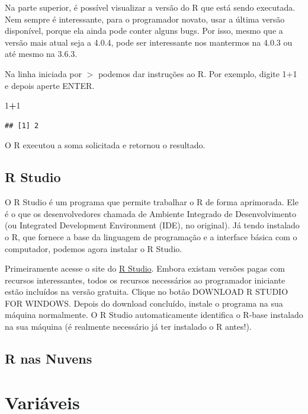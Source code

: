\documentclass[
]{book}
\newenvironment{Shaded}{\begin{snugshade}}{\end{snugshade}}
\newcommand{\DecValTok}[1]{\textcolor[rgb]{0.00,0.00,0.81}{#1}}
\newcommand{\OperatorTok}[1]{\textcolor[rgb]{0.81,0.36,0.00}{\textbf{#1}}}
\begin{document}
Na parte superior, é possível visualizar a versão do R que está sendo executada. Nem sempre é interessante, para o programador novato, usar a última versão disponível, porque ela ainda pode conter alguns bugs. Por isso, mesmo que a versão mais atual seja a 4.0.4, pode ser interessante nos mantermos na 4.0.3 ou até mesmo na 3.6.3.

Na linha iniciada por \(>\) podemos dar instruções ao R. Por exemplo, digite 1+1 e depois aperte ENTER.

\begin{Shaded}
\begin{Highlighting}[]
\DecValTok{1}\OperatorTok{+}\DecValTok{1}
\end{Highlighting}
\end{Shaded}

\begin{verbatim}
## [1] 2
\end{verbatim}

O R executou a soma solicitada e retornou o resultado.

\hypertarget{r-studio}{%
\section{R Studio}\label{r-studio}}

O R Studio é um programa que permite trabalhar o R de forma aprimorada. Ele é o que os desenvolvedores chamada de Ambiente Integrado de Desenvolvimento (ou Integrated Development Environment (IDE), no original). Já tendo instalado o R, que fornece a base da linguagem de programação e a interface básica com o computador, podemos agora instalar o R Studio.

Primeiramente acesse o site do \href{https://www.rstudio.com/products/rstudio/download/\#download}{R Studio}. Embora existam versões pagas com recursos interessantes, todos os recursos necessários ao programador iniciante estão incluídos na versão gratuita. Clique no botão DOWNLOAD R STUDIO FOR WINDOWS. Depois do download concluído, instale o programa na sua máquina normalmente. O R Studio automaticamente identifica o R-base instalado na sua máquina (é realmente necessário já ter instalado o R antes!).

\hypertarget{r-nas-nuvens}{%
\section{R nas Nuvens}\label{r-nas-nuvens}}

\hypertarget{variuxe1veis}{%
\chapter{Variáveis}\label{variuxe1veis}}
\end{document}
